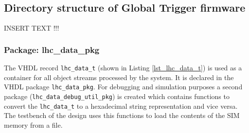 \subsection{Directory structure of Global Trigger firmware} \label{dir_struct_gt_fw}

INSERT TEXT !!!

\subsubsection{Package: lhc\_data\_pkg} \label{section_lhc_data_pkg}

The VHDL record \texttt{lhc\_data\_t} (shown in Listing \ref{lst_lhc_data_t}) is used as a container for all object streams processed by the system. It is declared in the VHDL package \texttt{lhc\_data\_pkg}.
For debugging and simulation purposes a second package (\texttt{lhc\_data\_debug\_util\_pkg}) is created which contains functions to convert the \texttt{lhc\_data\_t} to a hexadecimal string representation and vice versa. The testbench of the design uses this functions to load the contents of the SIM memory from a file.



\clearpage
